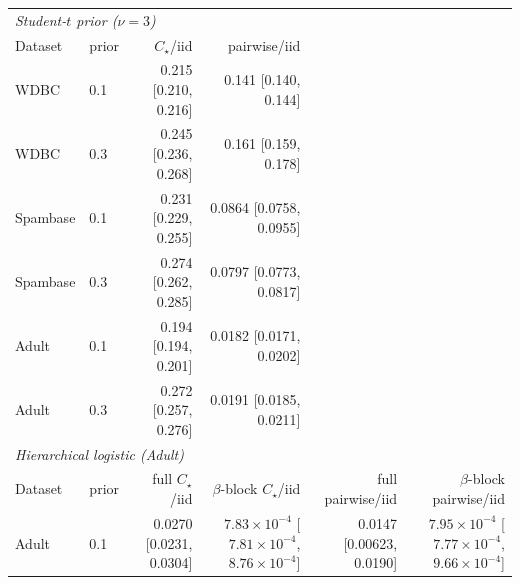 \begin{tabular}{llrrrr}
\toprule
\multicolumn{6}{l}{\emph{Student-$t$ prior ($\nu=3$)}} \\
Dataset & prior & $C_\star$/iid & pairwise/iid & & \\
\midrule
WDBC & 0.1 & 0.215 [0.210, 0.216] & 0.141 [0.140, 0.144] & & \\
WDBC & 0.3 & 0.245 [0.236, 0.268] & 0.161 [0.159, 0.178] & & \\
Spambase & 0.1 & 0.231 [0.229, 0.255] & 0.0864 [0.0758, 0.0955] & & \\
Spambase & 0.3 & 0.274 [0.262, 0.285] & 0.0797 [0.0773, 0.0817] & & \\
Adult & 0.1 & 0.194 [0.194, 0.201] & 0.0182 [0.0171, 0.0202] & & \\
Adult & 0.3 & 0.272 [0.257, 0.276] & 0.0191 [0.0185, 0.0211] & & \\
\midrule
\multicolumn{6}{l}{\emph{Hierarchical logistic (Adult)}} \\
Dataset & prior & full $C_\star$/iid & $\beta$-block $C_\star$/iid & full pairwise/iid & $\beta$-block pairwise/iid \\
\midrule
Adult & 0.1 & 0.0270 [0.0231, 0.0304] & $7.83\times 10^{-4}$ [$7.81\times 10^{-4}$, $8.76\times 10^{-4}$] & 0.0147 [0.00623, 0.0190] & $7.95\times 10^{-4}$ [$7.77\times 10^{-4}$, $9.66\times 10^{-4}$] \\
\bottomrule
\end{tabular}
